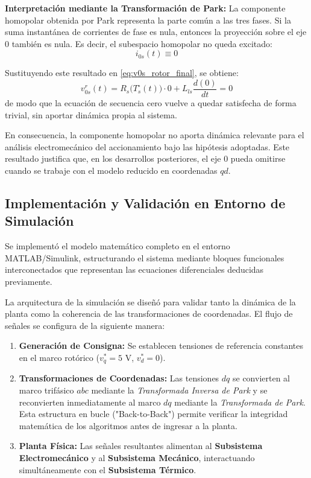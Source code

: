 \documentclass[12pt, a4paper,journal, onecolumn, compsoc]{IEEEtran}
\begin{document}
    \textbf{Interpretación mediante la Transformación de Park:}
    La componente homopolar obtenida por Park representa la parte común a las tres fases. Si la suma instantánea de corrientes de fase es nula, entonces la proyección sobre el eje \(0\) también es nula. Es decir, el subespacio homopolar no queda excitado:
    \begin{equation}
        i_{0s}(t)\equiv 0
    \end{equation}

    Sustituyendo este resultado en \eqref{eq:v0s_rotor_final}, se obtiene:
    \begin{equation}
        v_{0s}^r(t)=R_s\!\big(T_s^\circ(t)\big)\cdot 0 + L_{ls}\frac{d(0)}{dt}=0
    \end{equation}
    de modo que la ecuación de secuencia cero vuelve a quedar satisfecha de forma trivial, sin aportar dinámica propia al sistema.

    En consecuencia, la componente homopolar no aporta dinámica relevante para el análisis electromecánico del accionamiento bajo las hipótesis adoptadas. Este resultado justifica que, en los desarrollos posteriores, el eje \(0\) pueda omitirse cuando se trabaje con el modelo reducido en coordenadas \(qd\).


\subsection{Implementación y Validación en Entorno de Simulación}
Se implementó el modelo matemático completo en el entorno MATLAB/Simulink, estructurando el sistema mediante bloques funcionales interconectados que representan las ecuaciones diferenciales deducidas previamente.

La arquitectura de la simulación se diseñó para validar tanto la dinámica de la planta como la coherencia de las transformaciones de coordenadas. El flujo de señales se configura de la siguiente manera:
\begin{enumerate}
    \item \textbf{Generación de Consigna:} Se establecen tensiones de referencia constantes en el marco rotórico ($v_q^*=5$ V, $v_d^*=0$).
    \item \textbf{Transformaciones de Coordenadas:} Las tensiones $dq$ se convierten al marco trifásico $abc$ mediante la \textit{Transformada Inversa de Park} y se reconvierten inmediatamente al marco $dq$ mediante la \textit{Transformada de Park}. Esta estructura en bucle ("Back-to-Back") permite verificar la integridad matemática de los algoritmos antes de ingresar a la planta.
    \item \textbf{Planta Física:} Las señales resultantes alimentan al \textbf{Subsistema Electromecánico} y al \textbf{Subsistema Mecánico}, interactuando simultáneamente con el \textbf{Subsistema Térmico}.
\end{enumerate}
\end{document}

